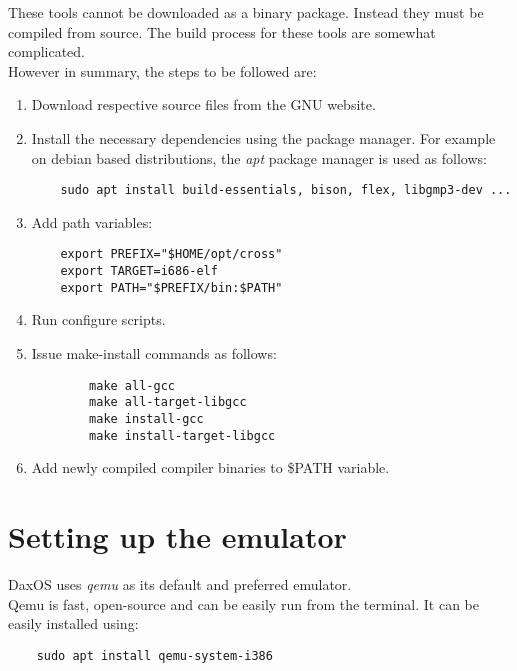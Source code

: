 These tools cannot be downloaded as a binary package. Instead they must be compiled from source.
The build process for these tools are somewhat complicated.\\
However in summary, the steps to be followed are:
\begin{enumerate}
    \item Download respective source files from the GNU website.

    \item Install the necessary dependencies using the package manager.
    For example on debian based distributions, the \textit{apt} package manager is used as follows:
    \begin{lstlisting}
    sudo apt install build-essentials, bison, flex, libgmp3-dev ...
    \end{lstlisting}

    \item Add path variables:
    \begin{lstlisting}
    export PREFIX="$HOME/opt/cross"
    export TARGET=i686-elf
    export PATH="$PREFIX/bin:$PATH"
    \end{lstlisting}

    \item Run configure scripts.
    
    \item Issue make-install commands as follows:
    \begin{lstlisting}
        make all-gcc
        make all-target-libgcc
        make install-gcc
        make install-target-libgcc
    \end{lstlisting}

    \item Add newly compiled compiler binaries to \$PATH variable.

\end{enumerate}
\pagebreak

\section{Setting up the emulator}\label{section:Setting up the emulator}
DaxOS uses \textit{qemu} as its default and preferred emulator.\\
Qemu is fast, open-source and can be easily run from the terminal.
It can be easily installed using:
\begin{lstlisting}
    sudo apt install qemu-system-i386
\end{lstlisting}

